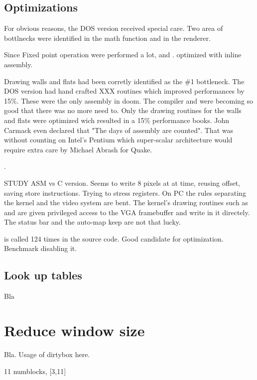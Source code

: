 \subsection{Optimizations}
For obvious reasons, the DOS version received special care. Two area of bottlnecks were identified in the math function and in the renderer.\\
\par
Since Fixed point operation were performed a lot,  and  .  optimized with inline assembly.\\
\par



Drawing walls and flats had been corretly identified as the \#1 bottleneck. The DOS version had hand crafted XXX routines which improved performances by 15\%. These were the only assembly in doom. The compiler and  were becoming so good that there was no more need to. Only the drawing routines for the walls and flats were optimized wich resulted in a 15\% performance books. John Carmack even declared that "The days of assembly are counted". That was without counting on Intel's Pentium which super-scalar architecture would require extra care by Michael Abrash for Quake.\\
\par
 .
 \par
 STUDY ASM vs C version. Seems to write 8 pixels at at time, reusing offset, saving store instructions. Trying to stress registers. On PC the rules separating the kernel and the video system are bent. The kernel's drawing routines such as  and  are given privileged access to the VGA framebuffer and write in it directely. The status bar and the auto-map keep are not that lucky.\\
 \par
  is called 124 times in the source code. Good candidate for optimization. Benchmark disabling it.
 \par

\subsection{Look up tables}
Bla
\section{Reduce window size}
Bla. Usage of dirtybox here.
\par
{}
\par
11 numblocks, [3,11]\\
\par
{}
\par


